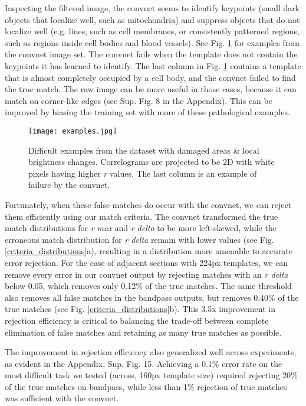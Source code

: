 \documentclass{article}
\begin{document}
Inspecting the filtered image, the convnet seems to identify keypoints (small dark objects that localize well, such as mitochondria) and suppress objects that do not localize well (e.g. lines, such as cell membranes, or consistently patterned regions, such as regions inside cell bodies and blood vessels). See Fig. \ref{ncc_examples2} for examples from the convnet image set. The convnet fails when the template does not contain the keypoints it has learned to identify. The last column in Fig. \ref{ncc_examples2} contains a template that is almost completely occupied by a cell body, and the convnet failed to find the true match. The raw image can be more useful in those cases, because it can match on corner-like edges (see Sup. Fig. 8 in the Appendix). This can be improved by biasing the training set with more of these pathological examples.

\begin{figure}[h]
  \centering
  
  \texttt{[image: examples.jpg]}
  \caption{Difficult examples from the dataset with damaged areas \& local brightness changes. Correlograms are projected to be 2D with white pixels having higher \textit{r} values. The last column is an example of failure by the convnet.}
  \label{ncc_examples2}
\end{figure}

Fortunately, when these false matches do occur with the convnet, we can reject them efficiently using our match criteria. The convnet transformed the true match distributions for \textit{r max} and \textit{r delta} to be more left-skewed, while the erroneous match distribution for \textit{r delta} remain with lower values (see Fig. \ref{criteria_distributions}a), resulting in a distribution more amenable to accurate error rejection. For the case of adjacent sections with 224px templates, we can remove every error in our convnet output by rejecting matches with an \textit{r delta} below 0.05, which removes only 0.12\% of the true matches. The same threshold also removes all false matches in the bandpass outputs, but removes 0.40\% of the true matches (see Fig. \ref{criteria_distributions}b). This 3.5x improvement in rejection efficiency is critical to balancing the trade-off between complete elimination of false matches and retaining as many true matches as possible.

The improvement in rejection efficiency also generalized well across experiments, as evident in the Appendix, Sup. Fig. 15. Achieving a 0.1\% error rate on the most difficult task we tested (across, 160px template size) required rejecting 20\% of the true matches on bandpass, while less than 1\% rejection of true matches was sufficient with the convnet.
\end{document}
